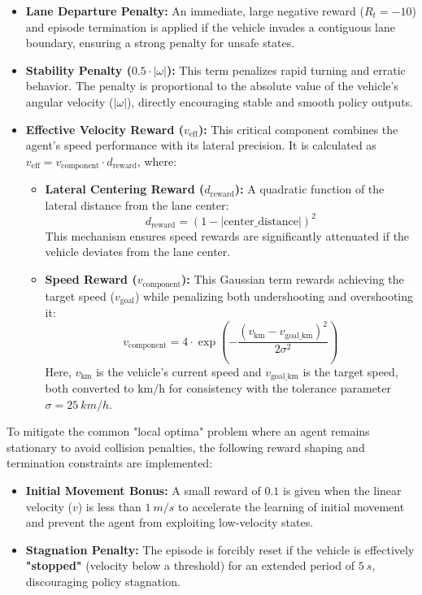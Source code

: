 \documentclass[]{interact}
\begin{document}
\begin{itemize}

    \item \textbf{Lane Departure Penalty:} An immediate, large negative reward ($R_t = -10$) and episode termination is applied if the vehicle invades a contiguous lane boundary, ensuring a strong penalty for unsafe states.

    \item \textbf{Stability Penalty ($0.5 \cdot |\omega|$):} This term penalizes rapid turning and erratic behavior. The penalty is proportional to the absolute value of the vehicle's angular velocity ($|\omega|$), directly encouraging stable and smooth policy outputs.

    \item \textbf{Effective Velocity Reward ($v_{\mathrm{eff}}$):} This critical component combines the agent's speed performance with its lateral precision. It is calculated as $v_{\mathrm{eff}} = v_{\text{component}} \cdot d_{\text{reward}}$, where:
    \begin{itemize}
        \item \textbf{Lateral Centering Reward ($d_{\text{reward}}$):} A quadratic function of the lateral distance from the lane center:
            $$d_{\text{reward}} = (1 - |\text{center\_distance}|)^2$$
            This mechanism ensures speed rewards are significantly attenuated if the vehicle deviates from the lane center.
        \item \textbf{Speed Reward ($v_{\text{component}}$):} This Gaussian term rewards achieving the target speed ($v_{\text{goal}}$) while penalizing both undershooting and overshooting it:
            $$v_{\text{component}} = 4 \cdot \exp\left(-\frac{(v_{\mathrm{km}} - v_{\text{goal\_km}})^2}{2 \sigma^2}\right)$$
            Here, $v_{\mathrm{km}}$ is the vehicle's current speed and $v_{\text{goal\_km}}$ is the target speed, both converted to $\text{km/h}$ for consistency with the tolerance parameter $\sigma = \SI{25}{km/h}$.
    \end{itemize}
\end{itemize}

To mitigate the common "local optima" problem where an agent remains stationary to avoid collision penalties, the following reward shaping and termination constraints are implemented:

\begin{itemize}
    \item \textbf{Initial Movement Bonus:} A small reward of $0.1$ is given when the linear velocity ($v$) is less than $\SI{1}{m/s}$ to accelerate the learning of initial movement and prevent the agent from exploiting low-velocity states.
    \item \textbf{Stagnation Penalty:} The episode is forcibly reset if the vehicle is effectively \textbf{"stopped"} (velocity below a threshold) for an extended period of $\SI{5}{s}$, discouraging policy stagnation.
\end{itemize}
\end{document}
